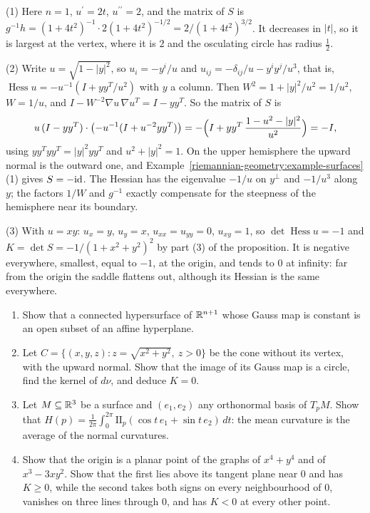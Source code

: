 \begin{solution}
(1) Here $n = 1$, $u^{\prime} = 2t$, $u^{\prime\prime} = 2$, and the matrix of $S$ is $g^{-1}h = (1 + 4t^2)^{-1}\cdot 2(1 + 4t^2)^{-1/2} = 2/(1 + 4t^2)^{3/2}$. It decreases in $|t|$, so it is largest at the vertex,
where it is $2$ and the osculating circle has radius $\frac12$.

(2) Write $u = \sqrt{1 - |y|^2}$, so $u_i = -y^i/u$ and $u_{ij} = -\delta_{ij}/u - y^iy^j/u^3$, that is, $\operatorname{Hess}u = -u^{-1}(I + yy^T/u^2)$ with $y$ a column. Then
$W^2 = 1 + |y|^2/u^2 = 1/u^2$, $W = 1/u$, and $I - W^{-2}\nabla u\,\nabla u^T = I - yy^T$. So the matrix of $S$ is
\[
u\,(I - yy^T)\cdot\bigl(-u^{-1}(I + u^{-2}yy^T)\bigr) = -\Bigl(I + yy^T\,\frac{1 - u^2 - |y|^2}{u^2}\Bigr) = -I ,
\]
using $yy^Tyy^T = |y|^2yy^T$ and $u^2 + |y|^2 = 1$. On the upper hemisphere the upward normal is the outward one, and Example~\ref{riemannian-geometry:example-surfaces}(1) gives $S = -\mathrm{id}$. The Hessian has the
eigenvalue $-1/u$ on $y^\perp$ and $-1/u^3$ along $y$; the factors $1/W$ and $g^{-1}$ exactly compensate for the steepness of the hemisphere near its boundary.

(3) With $u = xy$: $u_x = y$, $u_y = x$, $u_{xx} = u_{yy} = 0$, $u_{xy} = 1$, so $\det\operatorname{Hess}u = -1$ and $K = \det S = -1/(1 + x^2 + y^2)^2$ by part (3) of the proposition. It is negative
everywhere, smallest, equal to $-1$, at the origin, and tends to $0$ at infinity: far from the origin the saddle flattens out, although its Hessian is the same everywhere.
\end{solution}

\begin{exercise}\label{riemannian-geometry:exercise-gauss-map}
\begin{enumerate}
\item Show that a connected hypersurface of $\mathbb{R}^{n+1}$ whose Gauss map is constant is an open subset of an affine hyperplane.
\item Let $C = \{(x, y, z) : z = \sqrt{x^2 + y^2},\ z > 0\}$ be the cone without its vertex, with the upward normal. Show that the image of its Gauss map is a circle, find the kernel of $d\nu$, and deduce
$K = 0$.
\item Let $M \subseteq \mathbb{R}^3$ be a surface and $(e_1, e_2)$ any orthonormal basis of $T_pM$. Show that $H(p) = \frac{1}{2\pi}\int_0^{2\pi}\mathrm{II}_p(\cos t\,e_1 + \sin t\,e_2)\,dt$: the mean curvature is
the average of the normal curvatures.
\item Show that the origin is a planar point of the graphs of $x^4 + y^4$ and of $x^3 - 3xy^2$. Show that the first lies above its tangent plane near $0$ and has $K \geq 0$, while the second takes both signs
on every neighbourhood of $0$, vanishes on three lines through $0$, and has $K < 0$ at every other point.
\end{enumerate}
\end{exercise}

